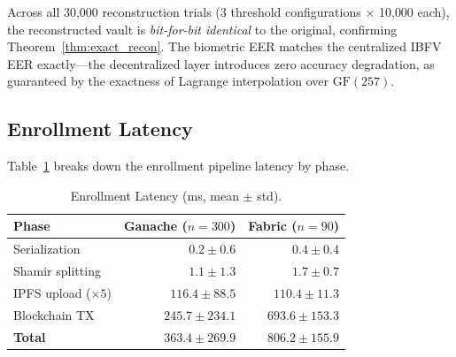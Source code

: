 \documentclass[3p,twocolumn]{elsarticle}
\newcommand{\IBFV}{\textsf{IBFV}}
\begin{document}
\begin{table}[t]
\centering
\caption{Vault Integrity: Reconstruction from $(t,n)$-Shamir shares.}
\label{tab:vault_integrity}
\end{table}

Across all 30{,}000 reconstruction trials (3 threshold configurations $\times$ 10{,}000 each), the reconstructed vault is \emph{bit-for-bit identical} to the original, confirming Theorem~\ref{thm:exact_recon}. The biometric EER matches the centralized \IBFV{} EER exactly---the decentralized layer introduces zero accuracy degradation, as guaranteed by the exactness of Lagrange interpolation over $\mathrm{GF}(257)$.

\subsection{Enrollment Latency}
\label{sec:enroll_latency}

Table~\ref{tab:enrollment_latency} breaks down the enrollment pipeline latency by phase.

\begin{table}[t]
\centering
\caption{Enrollment Latency (ms, mean $\pm$ std).}
\label{tab:enrollment_latency}
\begin{tabular}{@{}l r r@{}}
\toprule
\textbf{Phase} & \textbf{Ganache} ($n{=}300$) & \textbf{Fabric} ($n{=}90$) \\
\midrule
Serialization & $0.2 \pm 0.6$ & $0.4 \pm 0.4$ \\
Shamir splitting & $1.1 \pm 1.3$ & $1.7 \pm 0.7$ \\
IPFS upload ($\times 5$) & $116.4 \pm 88.5$ & $110.4 \pm 11.3$ \\
Blockchain TX & $245.7 \pm 234.1$ & $693.6 \pm 153.3$ \\
\midrule
\textbf{Total} & $\mathbf{363.4 \pm 269.9}$ & $\mathbf{806.2 \pm 155.9}$ \\
\bottomrule
\end{tabular}
\end{table}
\end{document}

